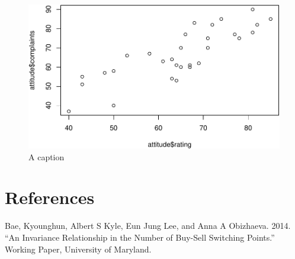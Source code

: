 \documentclass[12pt,]{article}
\begin{document}
\begin{figure}
\centering
\includegraphics{main_files/figure-latex/unnamed-chunk-2-1.pdf}
\caption{A caption}
\end{figure}

\newpage

\hypertarget{references}{%
\section*{References}\label{references}}

\hypertarget{refs}{}
\leavevmode\hypertarget{ref-bae2014invariance}{}%
Bae, Kyounghun, Albert S Kyle, Eun Jung Lee, and Anna A Obizhaeva. 2014.
``An Invariance Relationship in the Number of Buy-Sell Switching
Points.'' Working Paper, University of Maryland.
\end{document}
